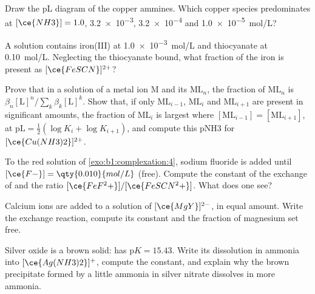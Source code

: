 \begin{exercise}[$\star$]\label{exo:b1:complexation:3}
Draw the pL diagram of the copper ammines. Which copper species
predominates at $[\ce{NH3}] = 1.0$, \num{3.2e-3}, \num{3.2e-4} and
\qty{1.0e-5}{mol/L}?
\end{exercise}

\begin{exercise}[$\star$]\label{exo:b1:complexation:4}
A solution contains iron(III) at \qty{1.0e-3}{mol/L} and thiocyanate at
\qty{0.10}{mol/L}. Neglecting the thiocyanate bound, what fraction of
the iron is present as $[\ce{FeSCN}]^{2+}$?
\end{exercise}

\begin{exercise}[$\star\star$]\label{exo:b1:complexation:5}
Prove that in a solution of a metal ion M and its 
$\mathrm{ML}_n$, the fraction of $\mathrm{ML}_n$ is
$\beta_n[\mathrm{L}]^n / \sum_{k} \beta_k[\mathrm{L}]^k$. Show that,
if only $\mathrm{ML}_{i-1}$, $\mathrm{ML}_i$ and $\mathrm{ML}_{i+1}$ are
present in significant amounts, the fraction of $\mathrm{ML}_i$ is
largest where $[\mathrm{ML}_{i-1}] = [\mathrm{ML}_{i+1}]$, at
$\mathrm{pL} = \frac12(\log K_i + \log K_{i+1})$, and compute this pNH3
for $[\ce{Cu(NH3)2}]^{2+}$.
\end{exercise}

\begin{exercise}[$\star\star$]\label{exo:b1:complexation:6}
To the red solution of \cref{exo:b1:complexation:4}, sodium fluoride is
added until $[\ce{F-}] = \qty{0.010}{mol/L}$ (free). Compute the constant
of the exchange of  and the ratio $[\ce{FeF^2+}]/[\ce{FeSCN^2+}]$.
What does one see?
\end{exercise}

\begin{exercise}[$\star\star$]\label{exo:b1:complexation:7}
Calcium ions are added to a solution of $[\ce{MgY}]^{2-}$, in equal
amount. Write the exchange reaction, compute its constant and the
fraction of magnesium set free.
\end{exercise}

\begin{exercise}[$\star\star$]\label{exo:b1:complexation:8}
Silver oxide  is a brown solid: 
has $\mathrm{p}K = 15.43$. Write its dissolution in ammonia into
$[\ce{Ag(NH3)2}]^{+}$, compute the constant, and explain why the brown
precipitate formed by a little ammonia in silver nitrate dissolves in
more ammonia.
\end{exercise}

